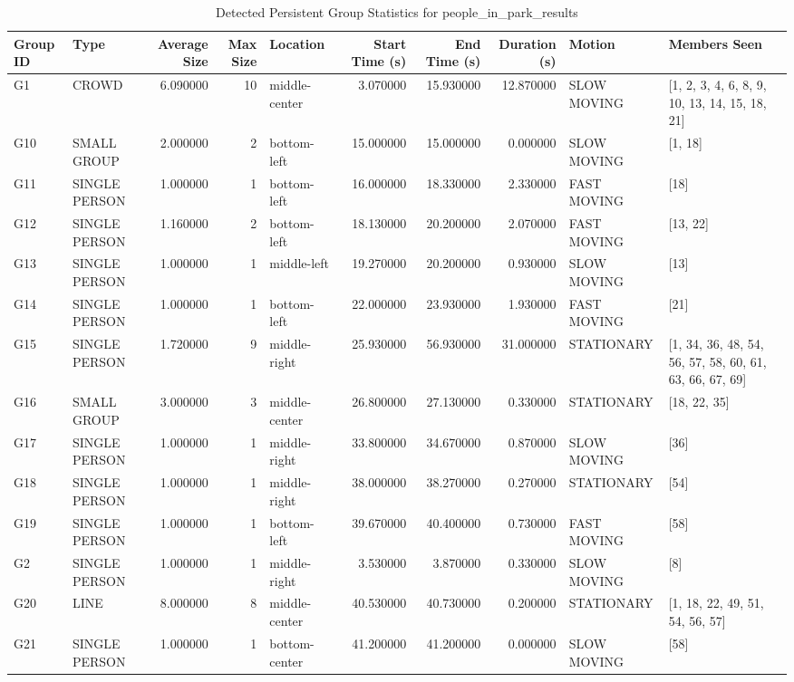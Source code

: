 \begin{table}
\caption{Detected Persistent Group Statistics for people_in_park_results}
\label{tab:people_in_park_results_group_statistics}
\begin{tabular}{llrrlrrrll}
\toprule
Group ID & Type & Average Size & Max Size & Location & Start Time (s) & End Time (s) & Duration (s) & Motion & Members Seen \\
\midrule
G1 & CROWD & 6.090000 & 10 & middle-center & 3.070000 & 15.930000 & 12.870000 & SLOW MOVING & [1, 2, 3, 4, 6, 8, 9, 10, 13, 14, 15, 18, 21] \\
G10 & SMALL GROUP & 2.000000 & 2 & bottom-left & 15.000000 & 15.000000 & 0.000000 & SLOW MOVING & [1, 18] \\
G11 & SINGLE PERSON & 1.000000 & 1 & bottom-left & 16.000000 & 18.330000 & 2.330000 & FAST MOVING & [18] \\
G12 & SINGLE PERSON & 1.160000 & 2 & bottom-left & 18.130000 & 20.200000 & 2.070000 & FAST MOVING & [13, 22] \\
G13 & SINGLE PERSON & 1.000000 & 1 & middle-left & 19.270000 & 20.200000 & 0.930000 & SLOW MOVING & [13] \\
G14 & SINGLE PERSON & 1.000000 & 1 & bottom-left & 22.000000 & 23.930000 & 1.930000 & FAST MOVING & [21] \\
G15 & SINGLE PERSON & 1.720000 & 9 & middle-right & 25.930000 & 56.930000 & 31.000000 & STATIONARY & [1, 34, 36, 48, 54, 56, 57, 58, 60, 61, 63, 66, 67, 69] \\
G16 & SMALL GROUP & 3.000000 & 3 & middle-center & 26.800000 & 27.130000 & 0.330000 & STATIONARY & [18, 22, 35] \\
G17 & SINGLE PERSON & 1.000000 & 1 & middle-right & 33.800000 & 34.670000 & 0.870000 & SLOW MOVING & [36] \\
G18 & SINGLE PERSON & 1.000000 & 1 & middle-right & 38.000000 & 38.270000 & 0.270000 & STATIONARY & [54] \\
G19 & SINGLE PERSON & 1.000000 & 1 & bottom-left & 39.670000 & 40.400000 & 0.730000 & FAST MOVING & [58] \\
G2 & SINGLE PERSON & 1.000000 & 1 & middle-right & 3.530000 & 3.870000 & 0.330000 & SLOW MOVING & [8] \\
G20 & LINE & 8.000000 & 8 & middle-center & 40.530000 & 40.730000 & 0.200000 & STATIONARY & [1, 18, 22, 49, 51, 54, 56, 57] \\
G21 & SINGLE PERSON & 1.000000 & 1 & bottom-center & 41.200000 & 41.200000 & 0.000000 & SLOW MOVING & [58] \\

\end{tabular}
\end{table}
